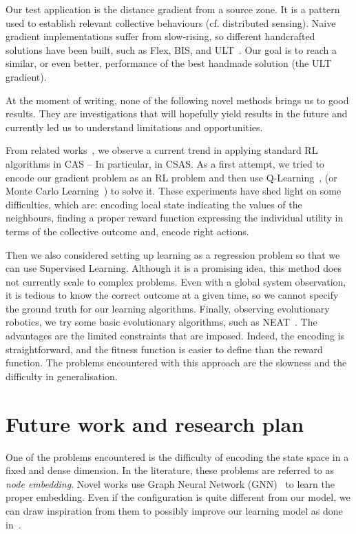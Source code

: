 \documentclass[conference]{IEEEtran}
\begin{document}
Our test application is the distance gradient from a source zone. %
%
It is a pattern used to establish relevant collective behaviours (cf. distributed sensing).
%
Naive gradient implementations suffer from slow-rising, so different handcrafted solutions have been built, such as Flex, BIS, and ULT~\cite{DBLP:conf/saso/AudritoCDV17}.
%
Our goal is to reach a similar, or even better, performance of the best handmade solution (the ULT gradient).

At the moment of writing, none of the following novel methods brings us to good results. They are investigations that will hopefully yield results in the future and currently led us to understand limitations and opportunities.

From related works~\cite{DAngelo2019}, we observe a current trend in applying standard RL algorithms in CAS -- In particular, in CSAS.
%
As a first attempt, we tried to encode our gradient problem as an RL problem and then use Q-Learning~\cite{DBLP:journals/ras/Krose95}, (or Monte Carlo Learning~\cite{DBLP:conf/nips/Thrun99}) to solve it.
%
These experiments have shed light on some difficulties, which are: encoding local state indicating the values of the neighbours, finding a proper reward function expressing the individual utility in terms of the collective outcome and, encode right actions. 

Then we also considered setting up learning as a regression problem so that we can use Supervised Learning.
% 
Although it is a promising idea, this method does not currently scale to complex problems.
%
Even with a global system observation, it is tedious to know the correct outcome at a given time, so we cannot specify the ground truth for our learning algorithms.
%
Finally, observing evolutionary robotics, we try some basic evolutionary algorithms, such as NEAT~\cite{DBLP:journals/ec/StanleyM02}.
%
The advantages are the limited constraints that are imposed. Indeed, the encoding is straightforward, and the fitness function is easier to define than the reward function.
%
The problems encountered with this approach are the slowness and the difficulty in generalisation.
%
\section{Future work and research plan}
One of the problems encountered is the difficulty of encoding the state space in a fixed and dense dimension. 
%
In the literature, these problems are referred to as \emph{node embedding}. 
%
Novel works use Graph Neural Network (GNN)~\cite{DBLP:journals/tnn/ScarselliGTHM09} to learn the proper embedding.
%
Even if the configuration is quite different from our model, we can draw inspiration from them to possibly improve our learning model as done in~\cite{DBLP:conf/nips/SukhbaatarSF16}.
\end{document}
